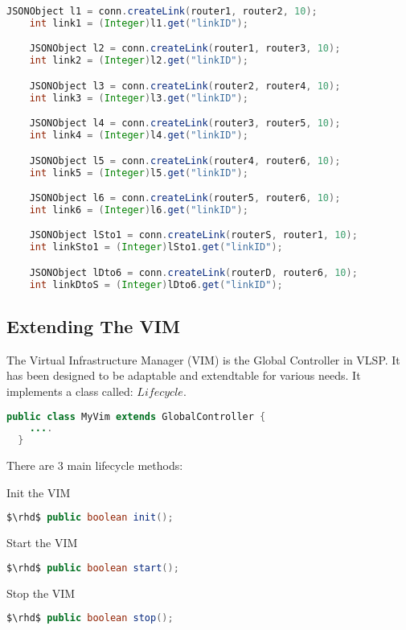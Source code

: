 \begin{lstlisting}[language=Java,frame=single]
    JSONObject l1 = conn.createLink(router1, router2, 10);
    int link1 = (Integer)l1.get("linkID");

    JSONObject l2 = conn.createLink(router1, router3, 10);
    int link2 = (Integer)l2.get("linkID");

    JSONObject l3 = conn.createLink(router2, router4, 10);
    int link3 = (Integer)l3.get("linkID");

    JSONObject l4 = conn.createLink(router3, router5, 10);
    int link4 = (Integer)l4.get("linkID");

    JSONObject l5 = conn.createLink(router4, router6, 10);
    int link5 = (Integer)l5.get("linkID");

    JSONObject l6 = conn.createLink(router5, router6, 10);
    int link6 = (Integer)l6.get("linkID");

    JSONObject lSto1 = conn.createLink(routerS, router1, 10);
    int linkSto1 = (Integer)lSto1.get("linkID");

    JSONObject lDto6 = conn.createLink(routerD, router6, 10);
    int linkDtoS = (Integer)lDto6.get("linkID");
\end{lstlisting}


\subsection{Extending The VIM}

The Virtual Infrastructure Manager (VIM) is the Global Controller in
VLSP.
It has been designed to be adaptable and extendtable for various
needs. It implements a class called: $Lifecycle$.

\begin{lstlisting}[language=java]
  public class MyVim extends GlobalController {
    ....
  }

\end{lstlisting}

\noindent There are 3 main lifecycle methods:

\noindent Init the VIM
\begin{lstlisting}[language=Java]
    $\rhd$ public boolean init();
\end{lstlisting}

\noindent Start the VIM
\begin{lstlisting}[language=Java]
    $\rhd$ public boolean start();
\end{lstlisting}

\noindent Stop the VIM
\begin{lstlisting}[language=Java]
    $\rhd$ public boolean stop();
\end{lstlisting}



